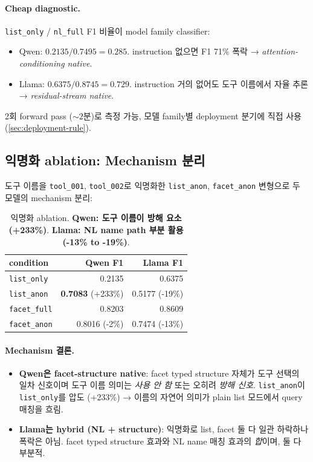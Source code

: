 \documentclass[11pt]{article}
\theoremstyle{definition}
\begin{document}
\paragraph{Cheap diagnostic.}
\texttt{list\_only} / \texttt{nl\_full} F1 비율이 model family classifier:
\begin{itemize}[leftmargin=*]
\item Qwen: $0.2135 / 0.7495 = \mathbf{0.285}$. instruction 없으면 F1 71\% 폭락 → \emph{attention-conditioning native}.
\item Llama: $0.6375 / 0.8745 = \mathbf{0.729}$. instruction 거의 없어도 도구 이름에서 자율 추론 → \emph{residual-stream native}.
\end{itemize}
2회 forward pass ($\sim 2$분)로 측정 가능, 모델 family별 deployment 분기에 직접 사용 (\cref{sec:deployment-rule}).

\subsection{익명화 ablation: Mechanism 분리}
\label{sec:exp-anon}

도구 이름을 \texttt{tool\_001}, \texttt{tool\_002}로 익명화한 \texttt{list\_anon}, \texttt{facet\_anon} 변형으로 두 모델의 mechanism 분리:

\begin{table}[h]
\centering
\caption{익명화 ablation. \textbf{Qwen: 도구 이름이 방해 요소 (+233\%)}. \textbf{Llama: NL name path 부분 활용 (-13\% to -19\%)}.}
\label{tab:anon}
\small
\begin{tabular}{lrr}
\toprule
condition & Qwen F1 & Llama F1 \\
\midrule
\texttt{list\_only}      & 0.2135 & 0.6375 \\
\texttt{list\_anon}      & \textbf{0.7083} (+233\%) & 0.5177 (-19\%) \\
\texttt{facet\_full}     & 0.8203 & 0.8609 \\
\texttt{facet\_anon}     & 0.8016 (-2\%) & 0.7474 (-13\%) \\
\bottomrule
\end{tabular}
\end{table}

\paragraph{Mechanism 결론.}
\begin{itemize}[leftmargin=*]
\item \textbf{Qwen은 facet-structure native}: facet typed structure 자체가 도구 선택의 일차 신호이며 도구 이름 의미는 \emph{사용 안 함} 또는 오히려 \emph{방해 신호}. \texttt{list\_anon}이 \texttt{list\_only}를 압도 (+233\%) → 이름의 자연어 의미가 plain list 모드에서 query 매칭을 흐림.
\item \textbf{Llama는 hybrid (NL + structure)}: 익명화로 list, facet 둘 다 일관 하락하나 폭락은 아님. facet typed structure 효과와 NL name 매칭 효과의 \emph{합}이며, 둘 다 부분적.
\end{itemize}
\end{document}

